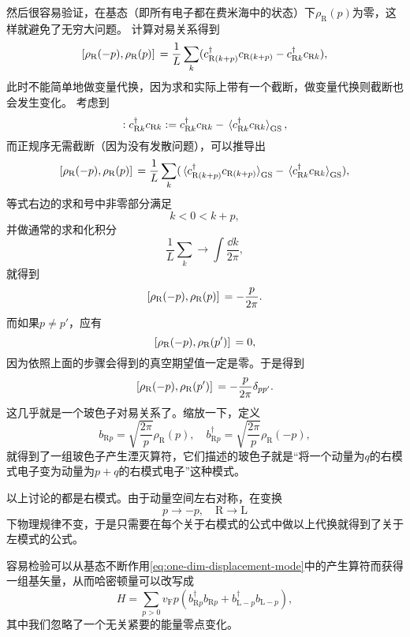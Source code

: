 然后很容易验证，在基态（即所有电子都在费米海中的状态）下${\rho}_\text{R}(p)$为零，这样就避免了无穷大问题。
计算对易关系得到
\[
    \comm*{{\rho}_\text{R}(- p)}{{\rho}_\text{R}(p)} = \frac{1}{L} \sum_{k} ({c}^\dagger_{\text{R} (k + p)} {c}_{\text{R} (k + p)} - {c}^\dagger_{\text{R} k} {c}_{\text{R} k}),
\]
此时不能简单地做变量代换，因为求和实际上带有一个截断，做变量代换则截断也会发生变化。
考虑到
\[
    : {c}^\dagger_{\text{R} k} {c}_{\text{R} k} : = {c}^\dagger_{\text{R} k} {c}_{\text{R} k} - \expval*{{c}^\dagger_{\text{R} k} {c}_{\text{R} k}}_\text{GS},
\]
而正规序无需截断（因为没有发散问题），可以推导出
\[
    \comm*{{\rho}_\text{R}(- p)}{{\rho}_\text{R}(p)} = \frac{1}{L} \sum_{k} (\expval*{{c}^\dagger_{\text{R} (k + p)} {c}_{\text{R} (k + p)}}_\text{GS} - \expval*{{c}^\dagger_{\text{R} k} {c}_{\text{R} k}}_\text{GS}),
\]
等式右边的求和号中非零部分满足
\[
    k < 0 < k + p,
\]
并做通常的求和化积分
\[
    \frac{1}{L} \sum_k \longrightarrow \int \frac{\dd{k}}{2\pi},
\]
就得到
\[
    \comm*{{\rho}_\text{R}(- p)}{{\rho}_\text{R}(p)} = - \frac{p}{2\pi}.
\]
而如果$p \neq p'$，应有
\[
    \comm*{{\rho}_\text{R}(- p)}{{\rho}_\text{R}(p')} = 0,
\]
因为依照上面的步骤会得到的真空期望值一定是零。于是得到
\begin{equation}
    \comm*{{\rho}_\text{R}(- p)}{{\rho}_\text{R}(p')} = - \frac{p}{2\pi} \delta_{pp'}.
\end{equation}
这几乎就是一个玻色子对易关系了。缩放一下，定义
\begin{equation}
    {b}_{\text{R} p} = \sqrt{\frac{2\pi}{p}} {\rho}_\text{R}(p), \quad {b}^\dagger_{\text{R} p} = \sqrt{\frac{2\pi}{p}} {\rho}_\text{R}(-p),
    \label{eq:one-dim-displacement-mode}
\end{equation}
就得到了一组玻色子产生湮灭算符，它们描述的玻色子就是“将一个动量为$q$的右模式电子变为动量为$p+q$的右模式电子”这种模式。

以上讨论的都是右模式。由于动量空间左右对称，在变换
\[
    p \longrightarrow -p, \quad \text{R} \longrightarrow \text{L}
\]
下物理规律不变，于是只需要在每个关于右模式的公式中做以上代换就得到了关于左模式的公式。

容易检验可以从基态不断作用\eqref{eq:one-dim-displacement-mode}中的产生算符而获得一组基矢量，从而哈密顿量可以改写成
\begin{equation}
    {H} = \sum_{p > 0} v_\text{F} p \left({b}_{\text{R} p}^\dagger {b}_{\text{R} p} + {b}_{\text{L} -p}^\dagger {b}_{\text{L} -p} \right),
    \label{eq:one-dim-displacement-hamiltonian}
\end{equation}
其中我们忽略了一个无关紧要的能量零点变化。

